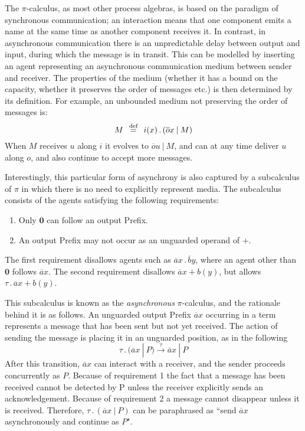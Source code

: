 \documentclass[10pt,a4paper]{article}
\newcommand{\nil}{\mathbf{0}}
\newcommand{\outp}[2]{\overline{#1}#2}
\newcommand{\inpp}[2]{#1(#2)}
\newcommand{\silp}{\tau}
\newcommand{\prefix}[2]{{#1}\,.\,#2}
\newcommand{\out}[3]{\prefix{\outp{#1}{#2}}{#3}}
\newcommand{\inp}[3]{\prefix{\inpp{#1}{#2}}{#3}}
\newcommand{\sil}[1]{\prefix{\silp}{#1}}
\newcommand{\defi}{\buildrel \text{def}\over =}
\newcommand{\para}{\:|\:}
\begin{document}
The $\pi$-calculus, as most other process algebras, is based on the paradigm of synchronous communication; an interaction means that one component emits a name at the same time as another component receives it. In contrast, in asynchronous communication there is an unpredictable delay between output and input, during which the message is in transit. This can be modelled by inserting an agent representing an asynchronous communication medium between sender and receiver. The properties of the medium (whether it has a bound on the capacity, whether it preserves the order of messages etc.) is then determined by its definition. For example, an unbounded medium not preserving the order of messages is:
\[
M \:\: \defi \:\: \inp{i}{x}{(\outp{o}{x} \para M)}
\]
When $M$ receives $u$ along $i$ it evolves to $\outp{o}{u} \para M$, and can at any time deliver $u$ along $o$, and also continue to accept more messages.

Interestingly, this particular form of asynchrony is also captured by a subcalculus of $\pi$ in which there is no need to explicitly represent media. The subcalculus consists of the agents satisfying the following requirements:

\begin{enumerate}
\item Only $\nil$ can follow an output Prefix.
\item An output Prefix may not occur as an unguarded operand of $+$.
\end{enumerate}

The first requirement disallows agents such as $\out{a}{x}{\outp{b}{y}}$, where an agent other than $\nil$ follows $\outp{a}{x}$. The second requirement disallows $\outp{a}{x} + \inpp{b}{y}$, but allows $\sil{\outp{a}{x}} + \inpp{b}{y}$.

This subcalculus is known as the \emph{asynchronous} $\pi$-calculus, and the rationale behind it is as follows. An unguarded output Prefix $\outp{a}{x}$ occurring in a term represents a message that has been sent but not yet received. The action of sending the message is placing it in an unguarded position, as in the following
\[
\sil{(\outp{a}{x} \para P)} \overset{\tau}{\longrightarrow} \outp{a}{x} \para P
\]
After this transition, $\outp{a}{x}$ can interact with a receiver, and the sender proceeds concurrently as $P$. Because of requirement 1 the fact that a message has been received cannot be detected by P unless the receiver explicitly sends an acknowledgement. Because of requirement 2 a message cannot disappear unless it is received. Therefore, $\sil{(\outp{a}{x} \para P)}$ can be paraphrased as ``send $\outp{a}{x}$ asynchronously and continue as $P$".
\end{document}
